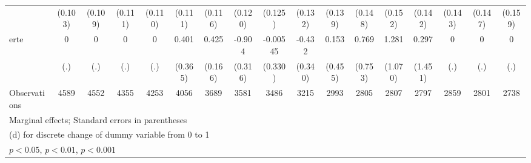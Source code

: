 {\begin{tabular}{l*{16}{c}}
                    &     (0.103)         &     (0.109)         &     (0.111)         &     (0.110)         &     (0.111)         &     (0.116)         &     (0.120)         &     (0.125)         &     (0.132)         &     (0.139)         &     (0.148)         &     (0.152)         &     (0.142)         &     (0.143)         &     (0.147)         &     (0.159)         \\
[1em]
erte                &           0         &           0         &           0         &           0         &       0.401         &       0.425\sym{*}  &      -0.904\sym{**} &    -0.00545         &      -0.432         &       0.153         &       0.769         &       1.281         &       0.297         &           0         &           0         &           0         \\
                    &         (.)         &         (.)         &         (.)         &         (.)         &     (0.365)         &     (0.166)         &     (0.316)         &     (0.330)         &     (0.340)         &     (0.455)         &     (0.753)         &     (1.070)         &     (1.451)         &         (.)         &         (.)         &         (.)         \\
\hline
Observations        &        4589         &        4552         &        4355         &        4253         &        4056         &        3689         &        3581         &        3486         &        3215         &        2993         &        2805         &        2807         &        2797         &        2859         &        2801         &        2738         \\
\hline\hline
\multicolumn{17}{l}{\footnotesize Marginal effects; Standard errors in parentheses}\\
\multicolumn{17}{l}{\footnotesize  (d) for discrete change of dummy variable from 0 to 1}\\
\multicolumn{17}{l}{\footnotesize \sym{*} \(p<0.05\), \sym{**} \(p<0.01\), \sym{***} \(p<0.001\)}\\
\end{tabular}
}
